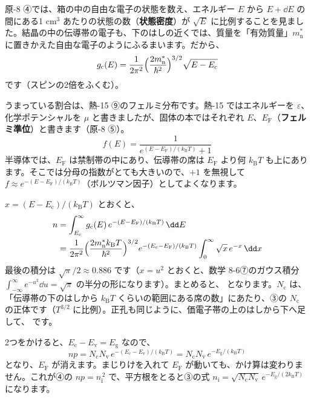原-8 ④では、箱の中の自由な電子の状態を数え、エネルギー $E$ から $E+\dd E$ の間にある1 cm$^3$ あたりの状態の数（\textbf{状態密度}）が $\sqrt{E}$ に比例することを見ました。結晶の中の伝導帯の電子も、下のはしの近くでは、質量を「有効質量」$m_{\mathrm n}^{*}$ に置きかえた自由な電子のようにふるまいます。だから、
\[ g_{\mathrm c}(E)=\frac{1}{2\pi^2}\Bigl(\frac{2m_{\mathrm n}^{*}}{\hbar^2}\Bigr)^{3/2}\sqrt{E-E_{\mathrm c}} \]
です（スピンの2倍をふくむ）。

うまっている割合は、熱-15 ⑨のフェルミ分布です。熱-15 ではエネルギーを $\varepsilon$、化学ポテンシャルを $\mu$ と書きましたが、固体の本ではそれぞれ $E$、$E_{\mathrm F}$（\textbf{フェルミ準位}）と書きます（原-8 ⑤）。
\[ f(E)=\frac{1}{e^{(E-E_{\mathrm F})/(k_{\mathrm B}T)}+1} \]
半導体では、$E_{\mathrm F}$ は禁制帯の中にあり、伝導帯の席は $E_{\mathrm F}$ より何 $k_{\mathrm B}T$ も上にあります。そこでは分母の指数がとても大きいので、$+1$ を無視して $f\approx e^{-(E-E_{\mathrm F})/(k_{\mathrm B}T)}$（ボルツマン因子）としてよくなります。

$x=(E-E_{\mathrm c})/(k_{\mathrm B}T)$ とおくと、
\begin{align*}
n&=\int_{E_{\mathrm c}}^{\infty}g_{\mathrm c}(E)\,e^{-(E-E_{\mathrm F})/(k_{\mathrm B}T)}\,\dd E\\
&=\frac{1}{2\pi^2}\Bigl(\frac{2m_{\mathrm n}^{*}k_{\mathrm B}T}{\hbar^2}\Bigr)^{3/2}e^{-(E_{\mathrm c}-E_{\mathrm F})/(k_{\mathrm B}T)}\int_0^{\infty}\sqrt{x}\,e^{-x}\,\dd x
\end{align*}
最後の積分は $\sqrt{\pi}/2\approx0.886$ です（$x=u^2$ とおくと、数学 8-6⑦のガウス積分 $\int_{-\infty}^{\infty}e^{-u^2}\dd u=\sqrt\pi$ の半分の形になります）。まとめると、
\label{ph:原-9:nc}となります。$N_{\mathrm c}$ は、「伝導帯の下のはしから $k_{\mathrm B}T$ くらいの範囲にある席の数」にあたり、③の $N_{\mathrm c}$ の正体です（$T^{3/2}$ に比例）。正孔も同じように、価電子帯の上のはしから下へ足して、
です。

2つをかけると、$E_{\mathrm c}-E_{\mathrm v}=E_{\mathrm g}$ なので、
\[ np=N_{\mathrm c}N_{\mathrm v}\,e^{-(E_{\mathrm c}-E_{\mathrm v})/(k_{\mathrm B}T)}=N_{\mathrm c}N_{\mathrm v}\,e^{-E_{\mathrm g}/(k_{\mathrm B}T)} \]
となり、$E_{\mathrm F}$ が消えます。まじりけを入れて $E_{\mathrm F}$ が動いても、かけ算は変わりません。これが④の $np=n_{\mathrm i}^{\,2}$ で、平方根をとると③の式 $n_{\mathrm i}=\sqrt{N_{\mathrm c}N_{\mathrm v}}\,e^{-E_{\mathrm g}/(2k_{\mathrm B}T)}$ になります。


